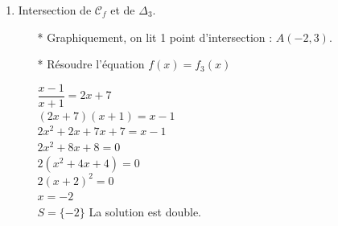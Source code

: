 \begin{enumerate}
\begin{itemize}
 \\

$S = ]-1, +\infty[ $ 

Les solutions sont les abscisses des points de $\mathcal{C}_f$ situés au dessous de $\Delta_2$.\\

\end{itemize}

\newpage 

\item Intersection de $\mathcal{C}_f$ et de $\Delta_3$.

\begin{itemize}
\item [*] Graphiquement, on lit 1 point d'intersection : $A(-2, 3)$.

\item [*] Résoudre l'équation $f(x) = f_3(x)$

$ \dfrac{x - 1}{x + 1} = 2x + 7$\\

$ (2x + 7) (x + 1) = x - 1  $\\
$ 2x^2 + 2x +7x +7  = x - 1$ \\
$ 2x^2 +8x +8 = 0 $\\
$ 2(x^2 +4x +4)  = 0 $ \\
$ 2(x + 2)^2  = 0 $ \\
$ x = -2 $ \\

$S=\{-2\}$ La solution est double. \\
               

\end{itemize}
\end{enumerate}
